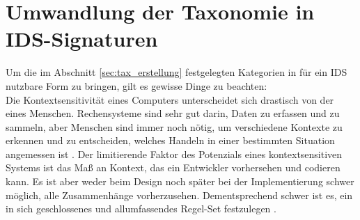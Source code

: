 \section{Umwandlung der Taxonomie in IDS-Signaturen} 
Um die im Abschnitt \ref{sec:tax_erstellung} festgelegten Kategorien in für ein IDS nutzbare Form zu bringen, gilt es gewisse Dinge zu beachten:\\ Die Kontextsensitivität eines Computers unterscheidet sich drastisch von der eines Menschen. Rechensysteme sind sehr gut darin, Daten zu erfassen und zu sammeln, aber Menschen sind immer noch nötig, um verschiedene Kontexte zu erkennen und zu entscheiden, welches Handeln in einer bestimmten Situation angemessen ist \cite{dey_understanding_2001}.
Der limitierende Faktor des Potenzials eines kontextsensitiven Systems ist das Maß an Kontext, das ein Entwickler vorhersehen und codieren kann.
Es ist aber weder beim Design noch später bei der Implementierung schwer möglich, alle Zusammenhänge vorherzusehen. Dementsprechend schwer ist es, ein in sich geschlossenes und allumfassendes Regel-Set festzulegen \cite{perera_context_2014}.
